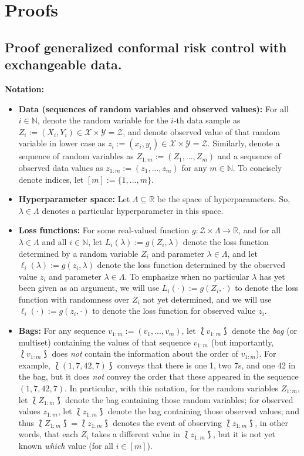 \section{Proofs}
\label{app:proofs}


\subsection{Proof generalized conformal risk control with exchangeable data.}
\label{app:gcrc_proof_nonmonotonic_1dim}

\textbf{Notation:}
\begin{itemize}
    \item \textbf{Data (sequences of random variables and observed values):} For all $i\in \mathbb{N}$, denote the random variable for the $i$-th data sample as $Z_i:=(X_i, Y_i)\in \mathcal{X}\times\mathcal{Y}=\mathcal{Z}$, and denote observed value of that random variable in lower case as $z_i:=(x_i, y_i)\in \mathcal{X}\times\mathcal{Y}=\mathcal{Z}$. Similarly, denote a sequence of random variables as $Z_{1:m}:=(Z_1, ..., Z_m)$ and a sequence of observed data values as $z_{1:m}:=(z_1, ..., z_m)$ for any $m \in \mathbb{N}$. To concisely denote indices, let $[m]:=\{1, ..., m\}$.
    \item \textbf{Hyperparameter space:} Let $\Lambda \subseteq \mathbb{R}$ be the space of hyperparameters. So, $\lambda\in \Lambda$ denotes a particular hyperparameter in this space.
    \item \textbf{Loss functions:} For some real-valued function $g :\mathcal{Z}\times \Lambda \rightarrow \mathbb{R}$, and for all $\lambda\in\Lambda$ and all $i\in \mathbb{N}$, let $L_i(\lambda):= g(Z_i,\lambda)$ denote the loss function determined by a random variable $Z_i$ and parameter $\lambda\in \Lambda$, and let $\ell_i(\lambda):= g(z_i,\lambda)$ denote the loss function determined by the observed value $z_i$ and parameter $\lambda\in \Lambda$. To emphasize when no particular $\lambda$ has yet been given as an argument, we will use $L_i(\cdot):=g(Z_i, \cdot)$ to denote the loss function with randomness over $Z_i$ not yet determined, and we will use $\ell_i(\cdot):= g(z_i, \cdot)$ to denote the loss function for observed value $z_i$. 
    \item \textbf{Bags:} For any sequence $v_{1:m}:=(v_1, ..., v_m)$, let $\lbag v_{1:m} \rbag$ denote the \textit{bag} (or multiset) containing the values of that sequence $v_{1:m}$ (but importantly, $\lbag v_{1:m} \rbag$ does \textit{not} contain the information about the order of $v_{1:m}$). For example, $\lbag (1, 7, 42, 7) \rbag$ conveys that there is one 1, two 7s, and one 42 in the bag, but it does \textit{not} convey the order that these appeared in the sequence $(1, 7, 42, 7)$. In particular, with this notation, for the random variables $Z_{1:m}$, let $\lbag Z_{1:m} \rbag$ denote the bag containing those random variables; for observed values $z_{1:m}$, let $\lbag z_{1:m} \rbag$ denote the bag containing those observed values; and thus $\lbag Z_{1:m} \rbag = \lbag z_{1:m} \rbag$ denotes the event of observing $\lbag z_{1:m} \rbag$, in other words, that each $Z_i$ takes a different value in $\lbag z_{1:m} \rbag$, but it is not yet known \textit{which} value (for all $i\in [m]$).

\end{itemize}
